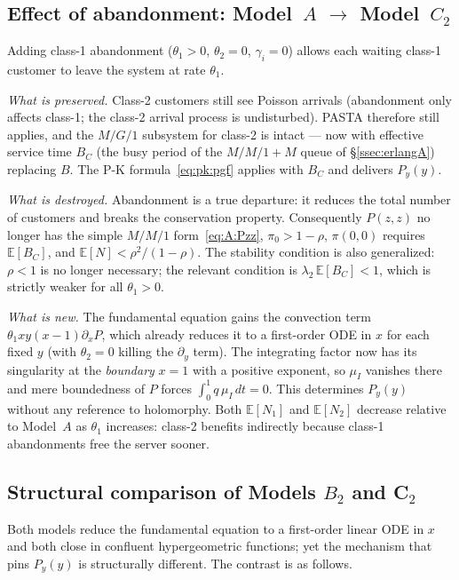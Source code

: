 \subsection*{Effect of abandonment: Model~$A$ $\to$ Model~$C_2$}

Adding class-1 abandonment ($\theta_1>0$, $\theta_2=0$, $\gamma_i=0$)
allows each waiting class-1 customer to leave the system at rate $\theta_1$.

\emph{What is preserved.}
Class-2 customers still see Poisson arrivals (abandonment only affects
class-1; the class-2 arrival process is undisturbed).
PASTA therefore still applies, and the $M/G/1$ subsystem for class-2 is
intact --- now with effective service time $B_C$ (the busy period of the
$M/M/1+M$ queue of \S\ref{ssec:erlangA}) replacing $B$.
The P-K formula~\eqref{eq:pk:pgf} applies with $B_C$ and delivers $P_y(y)$.

\emph{What is destroyed.}
Abandonment is a true departure: it reduces the total number of customers and
breaks the conservation property.  Consequently $P(z,z)$ no longer has the
simple $M/M/1$ form~\eqref{eq:A:Pzz}, $\pi_0>1-\rho$, $\pi(0,0)$ requires
$\mathbb{E}[B_C]$, and $\mathbb{E}[N]<\rho^2/(1-\rho)$.  The stability
condition is also generalized: $\rho<1$ is no longer necessary; the relevant
condition is $\lambda_2\,\mathbb{E}[B_C]<1$, which is strictly weaker for all
$\theta_1>0$.

\emph{What is new.}
The fundamental equation gains the convection term
$\theta_1 xy(x-1)\partial_x P$, which already reduces it to a first-order ODE
in $x$ for each fixed $y$ (with $\theta_2=0$ killing the $\partial_y$ term).
The integrating factor now has its singularity at the \emph{boundary} $x=1$
with a positive exponent, so $\mu_I$ vanishes there and mere boundedness of
$P$ forces $\int_0^1 q\,\mu_I\,dt=0$.  This determines $P_y(y)$ without any
reference to holomorphy.  Both $\mathbb{E}[N_1]$ and $\mathbb{E}[N_2]$ decrease
relative to Model~$A$ as $\theta_1$ increases: class-2 benefits indirectly
because class-1 abandonments free the server sooner.

\subsection*{Structural comparison of Models $B_2$ and C$_2$}

Both models reduce the fundamental equation to a first-order linear ODE in $x$
and both close in confluent hypergeometric functions; yet the mechanism that
pins $P_y(y)$ is structurally different.  The contrast is as follows.


